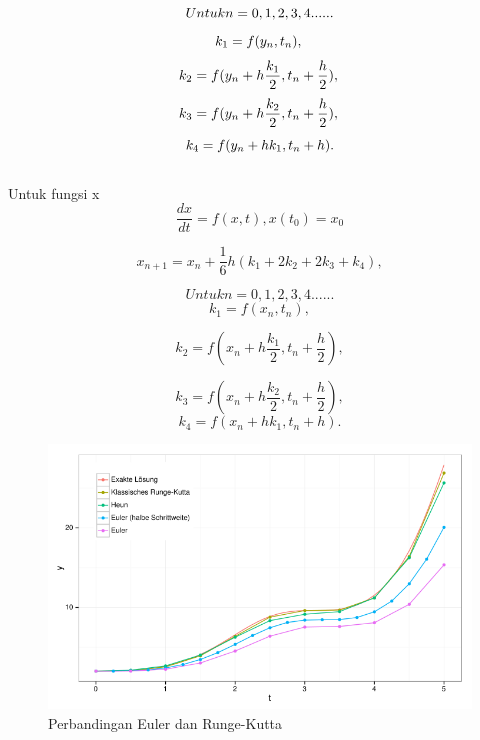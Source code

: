 \begin{equation}
Untuk n = 0,1,2,3,4 ......\\
\end{equation}
\begin{equation}
k_1 = f(y_{n} ,t_{n}),\\
\end{equation}
\begin{equation}
k_2 = f(y_{n}+h\dfrac{k_1}{2} ,t_{n}+\dfrac{h}{2}),\\
\end{equation}
\begin{equation}
k_3 = f(y_{n}+h\dfrac{k_2}{2} ,t_{n}+\dfrac{h}{2}),\\
\end{equation}
\begin{equation}
k_4 = f(y_{n}+hk_{1} ,t_{n}+h).\\
\end{equation}
\\
Untuk fungsi x
\begin{equation}
\dfrac{dx}{dt} =f(x,t) , x(t_0)=x_0
\end{equation}

\begin{equation}
x_{n+1} = x_{n} + \dfrac{1}{6}h (k_1+2k_2+2k_3+k_4),
\end{equation}

\begin{equation}
Untuk n = 0,1,2,3,4 ......
\end{equation}
\begin{equation}
k_1 = f(x_{n} ,t_{n}),
\end{equation}

\begin{equation}
k_2 = f(x_{n}+h\dfrac{k_1}{2} ,t_{n}+\dfrac{h}{2}),
\end{equation}

\begin{equation}
k_3 = f(x_{n}+h\dfrac{k_2}{2} ,t_{n}+\dfrac{h}{2}),
\end{equation}
\begin{equation}
k_4 = f(x_{n}+hk_{1} ,t_{n}+h).
\end{equation}


\begin{figure}

\centering
\includegraphics[scale=0.5]{gambar/comparison_euler}
\caption{Perbandingan Euler dan Runge-Kutta}
\end{figure}

